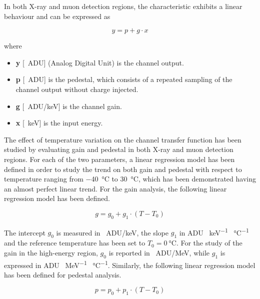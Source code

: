 \noindent
In both X-ray and muon detection regions, the characteristic exhibits a linear behaviour and can be expressed as

\begin{equation}
    y = p + g \cdot x
    \label{FDTlinearModel}
\end{equation}

\noindent
where

\begin{itemize}
    \itemsep0em
    \item \textbf{y} [\SI{}{ADU}] (Analog Digital Unit) is the channel output.
    \item \textbf{p} [\SI{}{ADU}] is the pedestal, which consists of a repeated sampling of the channel output without charge injected.
    \item \textbf{g} [\SI{}{ADU/\kilo\electronvolt}] is the channel gain.
    \item \textbf{x} [\SI{}{\kilo\electronvolt}] is the input energy.
\end{itemize}

The effect of temperature variation on the channel transfer function has been studied by evaluating gain and pedestal in both X-ray and muon detection regions. For each of the two parameters, a linear regression model has been defined in order to study the trend on both gain and pedestal with respect to temperature ranging from \SI{-40}{\celsius} to \SI{30}{\celsius}, which has been demonstrated having an almost perfect linear trend. For the gain analysis, the following linear regression model has been defined.

\begin{equation}
    g = g_{\textit{0}} + g_{\textit{1}} \cdot (T - T_{\textit{0}})
    \label{equationGain}
\end{equation}

\noindent
The intercept $g_{\textit{0}}$ is measured in \SI{}{ADU/\kilo\electronvolt}, the slope $g_{\textit{1}}$ in ADU \SI{}{\kilo\electronvolt^{-1}} \SI{}{\celsius^{-1}} and the reference temperature has been set to $T_{\textit{0}} = \SI{0}{\celsius}$. For the study of the gain in the high-energy region, $g_{0}$ is reported in \SI{}{ADU/\mega\electronvolt}, while $g_{1}$ is expressed in ADU \SI{}{\mega\electronvolt^{-1}} \SI{}{\celsius^{-1}}. Similarly, the following linear regression model has been defined for pedestal analysis.

\begin{equation}
    p = p_{\textit{0}} + p_{\textit{1}} \cdot (T - T_{\textit{0}})
\end{equation}

